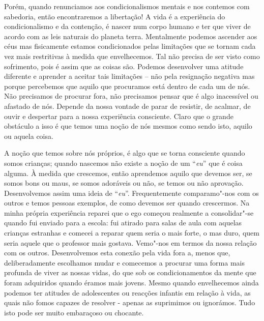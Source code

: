 Porém, quando renunciamos aos condicionalismos mentais e nos contemos
com sabedoria, então encontraremos a libertação! A vida é a experiência
do condicionalismo e da contenção, é nascer num corpo humano e ter que
viver de acordo com as leis naturais do planeta terra. Mentalmente
podemos ascender aos céus mas fisicamente estamos condicionados pelas
limitações que se tornam cada vez mais restritivas à medida que
envelhecemos. Tal não precisa de ser visto como sofrimento, pois é assim
que as coisas são. Podemos desenvolver uma atitude diferente e aprender
a aceitar tais limitações -- não pela resignação negativa mas porque
percebemos que aquilo que procuramos está dentro de cada um de nós. Não
precisamos de procurar fora, não precisamos pensar que é algo
inacessível ou afastado de nós. Depende da nossa vontade de parar de
resistir, de acalmar, de ouvir e despertar para a nossa experiência
consciente. Claro que o grande obstáculo a isso é que temos uma noção de
nós mesmos como sendo isto, aquilo ou aquela coisa.

A noção que temos sobre nós próprios, é algo que se torna consciente
quando somos crianças; quando nascemos não existe a noção de um
``\emph{eu}'' que é coisa alguma. À medida que crescemos, então aprendemos
aquilo que devemos ser, se somos bons ou maus, se somos adoráveis ou
não, se temos ou não aprovação. Desenvolvemos assim uma ideia de
``\emph{eu}''. Frequentemente comparamo"-nos com os outros e temos
pessoas exemplos, de como devemos ser quando crescermos. Na minha
própria experiência reparei que o ego começou realmente a consolidar"-se
quando fui enviado para a escola: fui atirado para salas de aula com
aquelas crianças estranhas e comecei a reparar quem seria o mais forte,
o mas duro, quem seria aquele que o professor mais gostava. Vemo"-nos em
termos da nossa relação com os outros. Desenvolvemos esta conexão pela
vida fora a, menos que, deliberadamente escolhamos mudar e comecemos a
procurar uma forma mais profunda de viver as nossas vidas, do que sob os
condicionamentos da mente que foram adquiridos quando éramos mais
jovens. Mesmo quando envelhecemos ainda podemos ter atitudes de
adolescentes ou reacções infantis em relação à vida, as quais não fomos
capazes de resolver - apenas as suprimimos ou ignorámos. Tudo isto pode
ser muito embaraçoso ou chocante.

